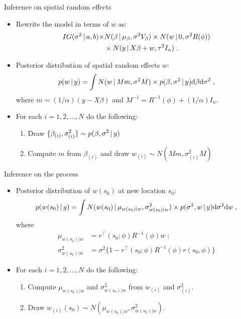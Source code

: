\begin{frame}{Inference on spatial random effects}
 
 \begin{itemize}\setlength{\itemsep}{0.4cm}
  \item Rewrite the model in terms of $w$ as:
 \begin{align*}
   IG(\sigma^2\,|\, a, b) \times & N(\beta \,|\, \mu_{\beta}, \sigma^2V_{\beta}) \times N(w\,|\, 0, \sigma^2 R(\phi)) \\
    &\times N(y\,|\, X\beta+w, \tau^2I_n)\; .
 \end{align*}

  \item Posterior distribution of spatial random effects $w$:
  \[
   p(w\,|\, y) = \int N(w\,|\, Mm,\sigma^2M)\times p(\beta,\sigma^2\,|\, y) \mbox{d}\beta\mbox{d}\sigma^2\;,
  \]
where $\displaystyle m = (1/\alpha)(y-X\beta)$ and $\displaystyle M^{-1} = R^{-1}(\phi) + (1/\alpha)I_n$.

  \item For each $i=1,2,\ldots,N$ do the following: 
 \begin{enumerate}\setlength{\itemsep}{0.25cm}
  \item Draw $\displaystyle \{\beta_{(i)},\sigma^2_{(i)}\} \sim p(\beta,\sigma^2\,|\, y)$
  \item Compute $m$ from $\beta_{(i)}$ and draw $\displaystyle w_{(i)} \sim N(Mm, \sigma^2_{(i)}M)$
 \end{enumerate}
 \end{itemize}
 
\end{frame}


\begin{frame}{Inference on the process}
 
 \begin{itemize}\setlength{\itemsep}{0.4cm}
  \item Posterior distribution of $w(s_0)$ at new location $s_0$:
  \[
   p(w(s_0)\,|\, y) = \int N(w(s_0)\,|\, \mu_{w(s_0)|w}, \sigma^2_{w(s_0)|w})\times p(\sigma^2, w \,|\, y) \mbox{d}\sigma^2\mbox{d}w\;,
  \]
  where 
  \begin{align*}
    \mu_{w(s_0)|w} &= r^{\top}(s_0; \phi)R^{-1}(\phi)w\;; \\
    \sigma^2_{w(s_0)|w} &=  \sigma^2\{1-r^{\top}(s_0; \phi)R^{-1}(\phi)r(s_0,\phi)\}
  \end{align*}
  \item For each $i=1,2,\ldots,N$ do the following: 
 \begin{enumerate}\setlength{\itemsep}{0.25cm}
  \item Compute $ \mu_{w(s_0)|w}$ and $\sigma^2_{w(s_0)|w}$ from $w_{(i)}$ and $\sigma^2_{(i)}$. 
  \item Draw $\displaystyle w_{(i)}(s_0) \sim N(\mu_{w(s_0)|w}, \sigma^2_{w(s_0)|w})$.
 \end{enumerate}
 \end{itemize}
 
\end{frame}

